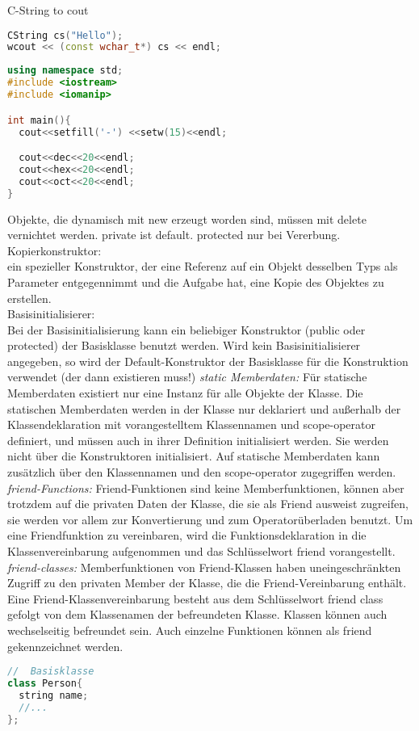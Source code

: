 \begin{multicols*}{3}

C-String to cout
\begin{lstlisting}[language=C++]
CString cs("Hello");
wcout << (const wchar_t*) cs << endl;
\end{lstlisting}
\HRule[4pt]
\begin{lstlisting}[language=C++]
using namespace std;
#include <iostream>
#include <iomanip>

int main(){
  cout<<setfill('-') <<setw(15)<<endl;

  cout<<dec<<20<<endl;
  cout<<hex<<20<<endl;
  cout<<oct<<20<<endl;
}
\end{lstlisting}
Objekte, die dynamisch mit new erzeugt worden sind, müssen mit delete vernichtet werden.
private ist default. protected nur bei Vererbung.
Kopierkonstruktor:\\
ein spezieller Konstruktor, der eine Referenz auf ein Objekt desselben Typs als Parameter entgegennimmt und die Aufgabe hat, eine Kopie des Objektes zu erstellen. \\
Basisinitialisierer:\\
Bei der Basisinitialisierung kann ein beliebiger Konstruktor (public oder protected) der Basisklasse benutzt werden.
Wird kein Basisinitialisierer angegeben, so wird der Default-Konstruktor der Basisklasse für die Konstruktion verwendet (der dann existieren muss!)
\emph{static Memberdaten:} Für statische Memberdaten existiert nur eine Instanz für alle Objekte der Klasse. Die statischen Memberdaten werden in der Klasse nur deklariert und außerhalb der Klassendeklaration mit vorangestelltem Klassennamen und scope-operator definiert, und müssen auch in ihrer Definition initialisiert werden. Sie werden nicht über die Konstruktoren initialisiert. Auf statische Memberdaten kann zusätzlich über den Klassennamen und den scope-operator zugegriffen werden.\\
\emph{friend-Functions:} Friend-Funktionen sind keine Memberfunktionen, können aber trotzdem auf die privaten Daten der Klasse, die sie als Friend ausweist zugreifen, sie werden vor allem zur Konvertierung und zum Operatorüberladen benutzt. Um eine Friendfunktion zu vereinbaren, wird die Funktionsdeklaration in die Klassenvereinbarung aufgenommen und das Schlüsselwort friend vorangestellt.\\
\emph{friend-classes:} Memberfunktionen von Friend-Klassen haben uneingeschränkten Zugriff zu den privaten Member der Klasse, die die Friend-Vereinbarung enthält. Eine Friend-Klassenvereinbarung besteht aus dem Schlüsselwort friend class gefolgt von dem Klassenamen der befreundeten Klasse. Klassen können auch wechselseitig befreundet sein. Auch einzelne Funktionen können als friend gekennzeichnet werden.
\begin{lstlisting}[language=C++]
//	Basisklasse
class Person{
  string name;
  //...
};


\end{lstlisting}
\end{multicols*}
